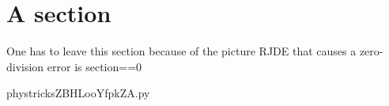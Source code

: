

\section{A section}

One has to leave this section because of the picture RJDE that causes a zero-division error is section==0 



    \newcommand{\CaptionFigZBHLooYfpkZA}{This is an automatically generated default caption; do not change.}
    \begin{center}
        
    \end{center}
    phystricksZBHLooYfpkZA.py

    


